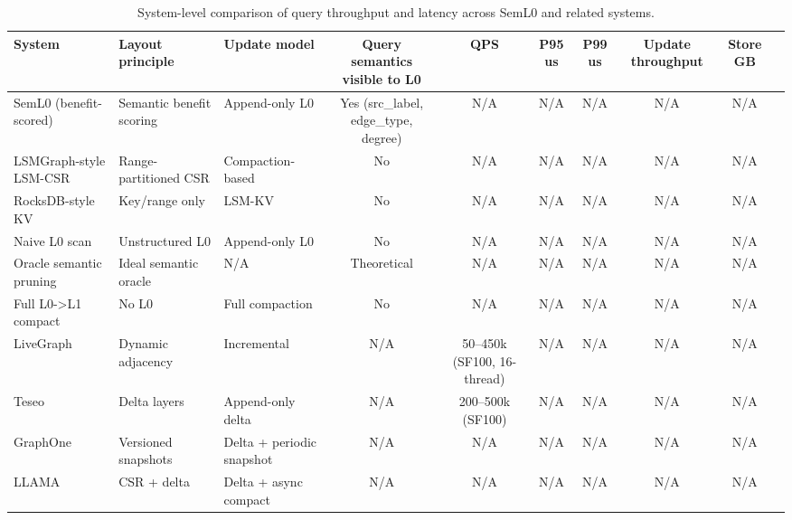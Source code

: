 \begin{table}[t]
\centering
\caption{System-level comparison of query throughput and latency across SemL0 and related systems.}
\label{tab:e11-system-baseline}
\begin{tabular}{lllccccccc}
\toprule
System & Layout principle & Update model & Query semantics visible to L0 & QPS & P95 us & P99 us & Update throughput & Store GB \\
\midrule
SemL0 (benefit-scored) & Semantic benefit scoring & Append-only L0 & Yes (src\_label, edge\_type, degree) & N/A & N/A & N/A & N/A & N/A \\
LSMGraph-style LSM-CSR & Range-partitioned CSR & Compaction-based & No & N/A & N/A & N/A & N/A & N/A \\
RocksDB-style KV & Key/range only & LSM-KV & No & N/A & N/A & N/A & N/A & N/A \\
Naive L0 scan & Unstructured L0 & Append-only L0 & No & N/A & N/A & N/A & N/A & N/A \\
Oracle semantic pruning & Ideal semantic oracle & N/A & Theoretical & N/A & N/A & N/A & N/A & N/A \\
Full L0->L1 compact & No L0 & Full compaction & No & N/A & N/A & N/A & N/A & N/A \\
LiveGraph & Dynamic adjacency & Incremental & N/A & 50–450k (SF100, 16-thread) & N/A & N/A & N/A & N/A \\
Teseo & Delta layers & Append-only delta & N/A & 200–500k (SF100) & N/A & N/A & N/A & N/A \\
GraphOne & Versioned snapshots & Delta + periodic snapshot & N/A & N/A & N/A & N/A & N/A & N/A \\
LLAMA & CSR + delta & Delta + async compact & N/A & N/A & N/A & N/A & N/A & N/A \\
\bottomrule
\end{tabular}
\end{table}
